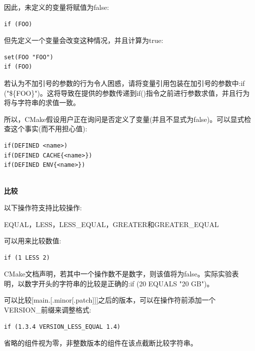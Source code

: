 因此，未定义的变量将赋值为false:

\begin{lstlisting}[style=styleCMake]
if (FOO)
\end{lstlisting}

但先定义一个变量会改变这种情况，并且计算为true:

\begin{lstlisting}[style=styleCMake]
set(FOO "FOO")
if (FOO)
\end{lstlisting}

\begin{tcolorbox}[colback=blue!5!white,colframe=blue!75!black,title=Note]
若认为不加引号的参数的行为令人困惑，请将变量引用包装在加引号的参数中:if ("\$\{FOO\}")。这将导致在提供的参数传递到if()指令之前进行参数求值，并且行为将与字符串的求值一致。
\end{tcolorbox}

所以，CMake假设用户正在询问是否定义了变量(并且不显式为false)。可以显式检查这个事实(而不用担心值):

\begin{lstlisting}[style=styleCMake]
if(DEFINED <name>)
if(DEFINED CACHE{<name>})
if(DEFINED ENV{<name>})
\end{lstlisting}

\hspace*{\fill} \\ %
\noindent
\textbf{比较}

以下操作符支持比较操作:

EQUAL，LESS，LESS\_EQUAL，GREATER和GREATER\_EQUAL

可以用来比较数值:

\begin{lstlisting}[style=styleCMake]
if (1 LESS 2)
\end{lstlisting}

\begin{tcolorbox}[colback=blue!5!white,colframe=blue!75!black,title=Note]
CMake文档声明，若其中一个操作数不是数字，则该值将为false。实际实验表明，以数字开头的字符串的比较是正确的:if (20 EQUALS "20 GB")。
\end{tcolorbox}

可以比较[main.[.minor[.patch]]]之后的版本，可以在操作符前添加一个VERSION\_前缀来调整格式:

\begin{lstlisting}[style=styleCMake]
if (1.3.4 VERSION_LESS_EQUAL 1.4)
\end{lstlisting}

省略的组件视为零，非整数版本的组件在该点截断比较字符串。

